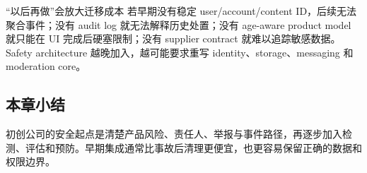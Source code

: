\begin{warningbox}{“以后再做”会放大迁移成本}
若早期没有稳定 user/account/content ID，后续无法聚合事件；没有 audit log 就无法解释历史处置；没有 age-aware product model 就只能在 UI 完成后硬塞限制；没有 supplier contract 就难以追踪敏感数据。Safety architecture 越晚加入，越可能要求重写 identity、storage、messaging 和 moderation core。
\end{warningbox}


\subsection{本章小结}

初创公司的安全起点是清楚产品风险、责任人、举报与事件路径，再逐步加入检测、评估和预防。早期集成通常比事故后清理更便宜，也更容易保留正确的数据和权限边界。

